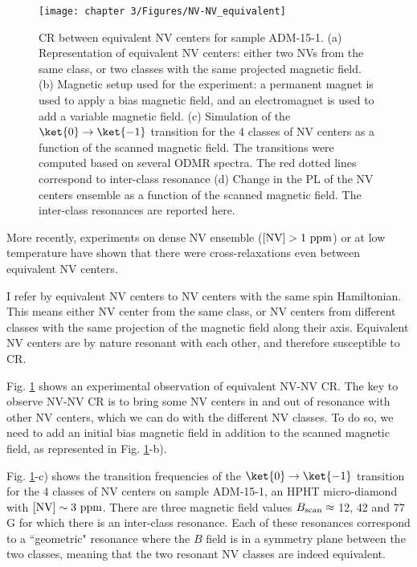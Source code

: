 \documentclass[a4paper,11pt]{report}
\begin{document}
\begin{refsection}
\begin{figure}[h]
\centering
\texttt{[image: chapter 3/Figures/NV-NV\_equivalent]}
\caption{CR between equivalent NV centers for sample ADM-15-1. (a) Representation of equivalent NV centers: either two NVs from the same class, or two classes with the same projected magnetic field. (b) Magnetic setup used for the experiment: a permanent magnet is used to apply a bias magnetic field, and an electromagnet is used to add a variable magnetic field. (c) Simulation of the $\ket{0}\to\ket{-1}$ transition for the 4 classes of NV centers as a function of the scanned magnetic field. The transitions were computed based on several ODMR spectra. The red dotted lines correspond to inter-class resonance (d) Change in the PL of the NV centers ensemble as a function of the scanned magnetic field. The inter-class resonances are reported here.}
\label{equivalent NV-NV}
\end{figure}

More recently, experiments \citep{jarmola2012temperature, mrozek2015longitudinal, jarmola2015longitudinal, choi2017depolarization} on dense NV ensemble ($[\rm NV ] >1\ \rm ppm$) or at low temperature have shown that there were cross-relaxations even between equivalent NV centers.

I refer by equivalent NV centers to NV centers with the same spin Hamiltonian. This means either NV center from the same class, or NV centers from different classes with the same projection of the magnetic field along their axis. Equivalent NV centers are by nature resonant with each other, and therefore susceptible to CR.

Fig. \ref{equivalent NV-NV} shows an experimental observation of equivalent NV-NV CR. The key to observe NV-NV CR is to bring some NV centers in and out of resonance with other NV centers, which we can do with the different NV classes. To do so, we need to add an initial bias magnetic field in addition to the scanned magnetic field, as represented in Fig. \ref{equivalent NV-NV}-b). %

Fig. \ref{equivalent NV-NV}-c) shows the transition frequencies of the $\ket{0}\to\ket{-1}$ transition for the 4 classes of NV centers on sample ADM-15-1, an HPHT micro-diamond with $[\rm NV]\sim 3\ \rm ppm$. There are three magnetic field values $B_{\rm scan} \approx$ 12, 42 and 77 G for which there is an inter-class resonance. Each of these resonances correspond to a ``geometric" resonance where the $B$ field is in a symmetry plane between the two classes, meaning that the two resonant NV classes are indeed equivalent.


\end{refsection}
\end{document}

